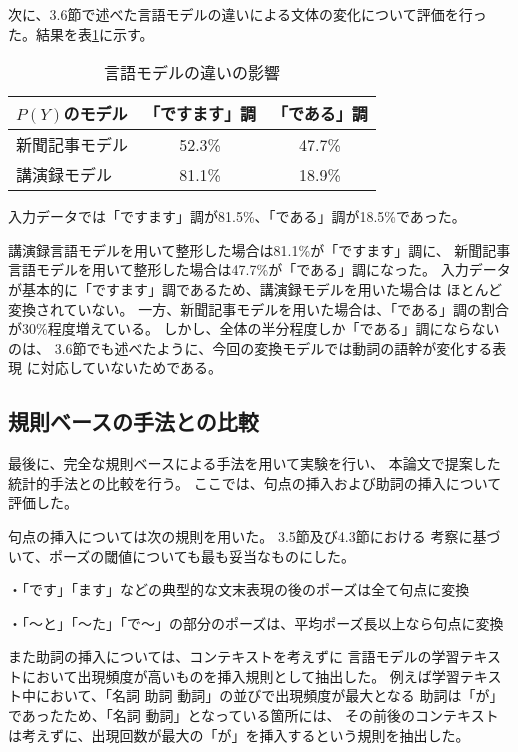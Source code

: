 次に、3.6節で述べた言語モデルの違いによる文体の変化について評価を行った。結果を表\ref{buntai}に示す。
\begin{table}[t]
\small
\caption{言語モデルの違いの影響}
\centering
 \begin{tabular}{|l||c|c|}
\hline
 $P(Y)$のモデル		& 「ですます」調 	& 「である」調		\\\hline\hline
 新聞記事モデル		& 52.3\%		& 47.7\%		\\\hline
 講演録モデル		& 81.1\%		& 18.9\%		\\\hline
 \end{tabular}
 \label{buntai}
\vspace{-3.0mm}
\end{table}

入力データでは「ですます」調が81.5\%、「である」調が18.5\%であった。

講演録言語モデルを用いて整形した場合は81.1\%が「ですます」調に、
新聞記事言語モデルを用いて整形した場合は47.7\%が「である」調になった。
入力データが基本的に「ですます」調であるため、講演録モデルを用いた場合は
ほとんど変換されていない。
一方、新聞記事モデルを用いた場合は、「である」調の割合が30\%程度増えている。
しかし、全体の半分程度しか「である」調にならないのは、
3.6節でも述べたように、今回の変換モデルでは動詞の語幹が変化する表現
に対応していないためである。

\subsection{規則ベースの手法との比較}

最後に、完全な規則ベースによる手法を用いて実験を行い、
本論文で提案した統計的手法との比較を行う。
ここでは、句点の挿入および助詞の挿入について評価した。

句点の挿入については次の規則を用いた。 3.5節及び4.3節における
考察に基づいて、ポーズの閾値についても最も妥当なものにした。

・「です」「ます」などの典型的な文末表現の後のポーズは全て句点に変換

・「〜と」「〜た」「で〜」の部分のポーズは、平均ポーズ長以上なら句点に変換

また助詞の挿入については、コンテキストを考えずに
言語モデルの学習テキストにおいて出現頻度が高いものを挿入規則として抽出した。
例えば学習テキスト中において、「名詞 助詞 動詞」の並びで出現頻度が最大となる
助詞は「が」であったため、「名詞 動詞」となっている箇所には、
その前後のコンテキストは考えずに、出現回数が最大の「が」を挿入するという規則を抽出した。

